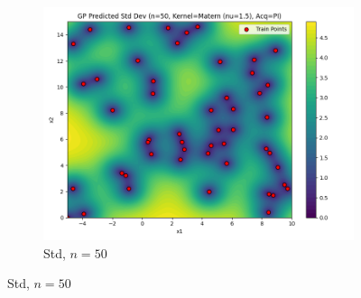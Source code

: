 \documentclass[a4paper,12pt]{article}
\begin{document}
\begin{figure}[H]
\begin{subfigure}{0.3\textwidth}
    \includegraphics[width=\linewidth]{Task-02/images/gp_std_matern_n50_PI.png}
    \caption{Std, $n=50$}
\end{subfigure}


\end{figure}
\end{document}

